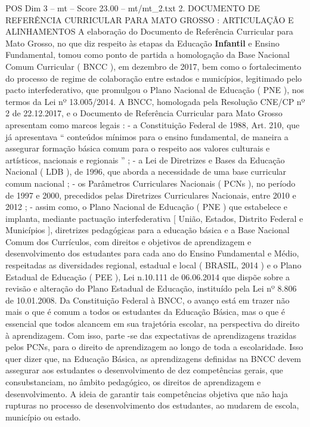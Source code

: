 \begin{textsample}{POS Dim 3 – mt – Score 23.00 – mt/mt\_2.txt}  \label{ex:f3_pos_080}
2.
DOCUMENTO DE REFERÊNCIA CURRICULAR PARA MATO GROSSO : ARTICULAÇÃO E ALINHAMENTOS A elaboração do Documento de Referência Curricular para Mato Grosso, no que diz respeito às etapas da Educação \textbf{Infantil} e Ensino Fundamental, tomou como ponto de partida a homologação da Base Nacional Comum Curricular ( BNCC ), em dezembro de 2017, bem como o fortalecimento do processo de regime de colaboração entre estados e municípios, legitimado pelo pacto interfederativo, que promulgou o Plano Nacional de Educação ( PNE ), nos termos da Lei nº 13.005/2014.
A BNCC, homologada pela Resolução CNE/CP nº 2 de 22.12.2017, e o Documento de Referência Curricular para Mato Grosso apresentam como marcos legais : - a Constituição Federal de 1988, Art. 210, que já apresentava “ conteúdos mínimos para o ensino fundamental, de maneira a assegurar formação básica comum para o respeito aos valores culturais e artísticos, nacionais e regionais ” ; - a Lei de Diretrizes e Bases da Educação Nacional ( LDB ), de 1996, que aborda a necessidade de uma base curricular comum nacional ; - os Parâmetros Curriculares Nacionais ( PCNs ), no período de 1997 e 2000, precedidos pelas Diretrizes Curriculares Nacionais, entre 2010 e 2012 ; - assim como, o Plano Nacional de Educação ( PNE ) que estabelece e implanta, mediante pactuação interfederativa [ União, Estados, Distrito Federal e Municípios ], diretrizes pedagógicas para a educação básica e a Base Nacional Comum dos Currículos, com direitos e objetivos de aprendizagem e desenvolvimento dos estudantes para cada ano do Ensino Fundamental e Médio, respeitadas as diversidades regional, estadual e local ( BRASIL, 2014 ) e o Plano Estadual de Educação ( PEE ), Lei n.10.111 de 06.06.2014 que dispõe sobre a revisão e alteração do Plano Estadual de Educação, instituído pela Lei nº 8.806 de 10.01.2008.
Da Constituição Federal à BNCC, o avanço está em trazer não mais o que é comum a todos os estudantes da Educação Básica, mas o que é essencial que todos alcancem em sua trajetória escolar, na perspectiva do direito à aprendizagem.
Com isso, parte -se das expectativas de aprendizagens trazidas pelos PCNs, para o direito de aprendizagem ao longo de toda a escolaridade.
Isso quer dizer que, na Educação Básica, as aprendizagens definidas na BNCC devem assegurar aos estudantes o desenvolvimento de dez competências gerais, que consubstanciam, no âmbito pedagógico, os direitos de aprendizagem e desenvolvimento.
A ideia de garantir tais competências objetiva que não haja rupturas no processo de desenvolvimento dos estudantes, ao mudarem de escola, município ou estado.

\end{textsample}
